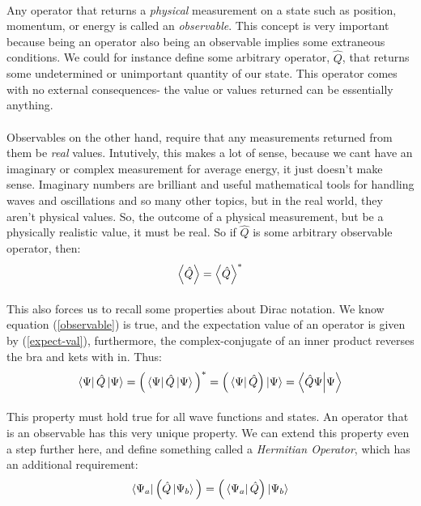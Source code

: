 \documentclass[12pt,letterpaper]{book}
\begin{document}
\paragraph*{}Any operator that returns a \textit{physical} measurement on a state such as position, momentum, or energy is called an \textit{observable}. This concept is very important because being an operator also being an observable implies some extraneous conditions. We could for instance define some arbitrary operator, $\hat{Q}$, that returns some undetermined or unimportant quantity of our state. This operator comes with no external consequences- the value or values returned can be essentially anything.
\paragraph*{}Observables on the other hand, require that any measurements returned from them be \textit{real} values. Intutively, this makes a lot of sense, because we cant have an imaginary or complex measurement for average energy, it just doesn't make sense. Imaginary numbers are brilliant and useful mathematical tools for handling waves and oscillations and so many other topics, but in the real world, they aren't physical values. So, the outcome of a physical measurement, but be a physically realistic value, it must be real. So if $\hat{Q}$ is some arbitrary observable operator, then:
\begin{equation}
\label{observable}
\expval{\hat{Q}} = \expval{\hat{Q}}^* 
\end{equation}
\paragraph*{}This also forces us to recall some properties about Dirac notation. We know equation (\ref{observable}) is true, and the expectation value of an operator is given by (\ref{expect-val}), furthermore, the complex-conjugate of an inner product reverses the bra and kets with in. Thus:
\begin{equation}
\bra{\Psi}\hat{Q}\ket{\Psi} = 
\Big(\bra{\Psi}\hat{Q}\ket{\Psi}\Big)^* = 
\Big(\bra{\Psi}\hat{Q}\Big)\ket{\Psi} = 
\bra{\hat{Q}\Psi}\ket{\Psi}
\end{equation}
\paragraph*{}This property must hold true for all wave functions and states. An operator that is an observable has this very unique property. We can extend this property even a step further here, and define something called a \textit{Hermitian Operator}, which has an additional requirement:
\begin{equation}
\bra{\Psi_a}\Big(\hat{Q}\ket{\Psi_b}\Big) = 
\Big(\bra{\Psi_a}\hat{Q}\Big)\ket{\Psi_b}
\end{equation}
\end{document}
